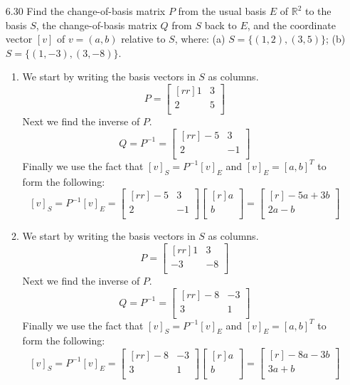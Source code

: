 \documentclass[12pt]{article}
\theoremstyle{definition}
\theoremstyle{plain}
\begin{document}
\begin{enumerate}
\item[6.30] Find the change-of-basis matrix $P$ from the usual basis $E$ of $\mathbb{R}^2$ to the basis $S$, the change-of-basis matrix $Q$ from $S$ back to $E$, and the coordinate vector $[v]$ of $v=(a,b)$ relative to $S$, where: (a) $S=\{(1,2),(3,5)\}$; (b) $S=\{(1,-3),(3,-8)\}$.
	\begin{enumerate}
	\item We start by writing the basis vectors in $S$ as columns.
	\[ P = \begin{bmatrix}[rr]1&3\\2&5\\\end{bmatrix} \]
	Next we find the inverse of $P$.
	\[ Q = P^{-1} = \begin{bmatrix}[rr]-5&3\\2&-1\\\end{bmatrix} \]
	Finally we use the fact that $[v]_S=P^{-1}[v]_E$ and $[v]_E=[a,b]^T$ to form the following:
	\[ [v]_S = P^{-1}[v]_E=\begin{bmatrix}[rr]-5&3\\2&-1\\\end{bmatrix}\begin{bmatrix}[r]a\\b\\\end{bmatrix}=\begin{bmatrix}[r]-5a+3b\\2a-b\\\end{bmatrix} \]
	\item We start by writing the basis vectors in $S$ as columns.
	\[ P = \begin{bmatrix}[rr]1&3\\-3&-8\\\end{bmatrix} \]
	Next we find the inverse of $P$.
	\[ Q = P^{-1} = \begin{bmatrix}[rr]-8&-3\\3&1\\\end{bmatrix} \]
	Finally we use the fact that $[v]_S=P^{-1}[v]_E$ and $[v]_E=[a,b]^T$ to form the following:
	\[ [v]_S = P^{-1}[v]_E=\begin{bmatrix}[rr]-8&-3\\3&1\\\end{bmatrix}\begin{bmatrix}[r]a\\b\\\end{bmatrix}=\begin{bmatrix}[r]-8a-3b\\3a+b\\\end{bmatrix} \]
	\end{enumerate}
	

\end{enumerate}
\end{document}

